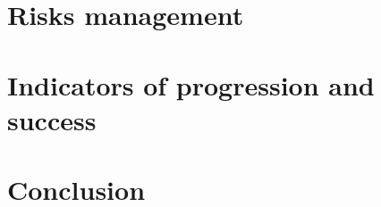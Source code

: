 \documentclass{article}
\begin{document}
\section{Risks management}
\label{risk-management}


\section{Indicators of progression and success}


\section{Conclusion}
\end{document}
